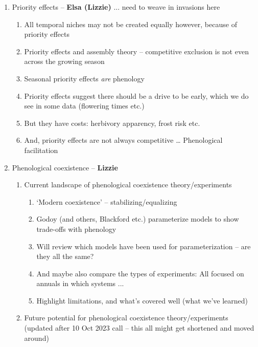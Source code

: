 \documentclass[11pt]{article}
\begin{document}
\begin{enumerate}
\begin{enumerate}
\item Priority effects  -- {\bf Elsa (Lizzie)} ... need to weave in invasions here %
\begin{enumerate}
\item All temporal niches may not be created equally however, because of priority effects 
\item Priority effects and assembly theory – competitive exclusion is not even across the growing season %
\item Seasonal priority effects \emph{are} phenology \citep{connolly1999,fukami2015} %
\item Priority effects suggest there should be a drive to be early, which we do see in some data (flowering times etc.) %
\item But they have costs: herbivory apparency, frost risk etc. 
\item And, priority effects are not always competitive … Phenological facilitation \cite{leverett2017}
\end{enumerate}
\item Phenological coexistence  -- {\bf Lizzie}
\begin{enumerate}
\item Current landscape of phenological coexistence theory/experiments
\begin{enumerate}
\item `Modern coexistence' -- stabilizing/equalizing 
\item Godoy (and others, Blackford etc.) parameterize models to show trade-offs with phenology %
\item Will review which models have been used for parameterization -- are they all the same?
\item And maybe also compare the types of experiments: All focused on annuals in  which systems ...
\item Highlight limitations, and what's covered well (what we've learned) %
\end{enumerate}
\item Future potential for phenological coexistence theory/experiments (updated after 10 Oct 2023 call -- this all might get shortened and moved around)

\end{enumerate}
\end{enumerate}
\end{enumerate}
\end{document}
